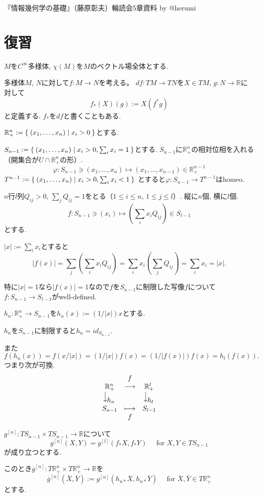 \documentclass{jsarticle}
\newcommand{\RR}{\mathbb{R}}
\theoremstyle{definition}
\numberwithin{theorem}{section}
\begin{document}
『情報幾何学の基礎』（藤原彰夫）輪読会5章資料 by @herumi

\section{復習}
$M$を$C^\infty$多様体, $\chi(M)$を$M$のベクトル場全体とする.

多様体$M$, $N$に対して$f:M \rightarrow N$を考える。
$df:TM \rightarrow TN$を$X \in TM$, $g:N \rightarrow \RR$に対して
\[
f_*(X)(g):=X(f^*g)
\]
と定義する. $f_*$を$df$と書くこともある.

$\RR^n_+:=\Set{(x_1, \dots, x_n)|x_i>0}$とする.

$S_{n-1}:=\Set{(x_1, \dots, x_n)|x_i>0, \sum_i x_i = 1}$とする.
$S_{n-1}$に$\RR^n_+$の相対位相を入れる（開集合が$U \cap \RR^n_+$の形）.
\[
\varphi:S_{n-1} \ni (x_1, \dots, x_n) \mapsto (x_1, \dots, x_{n-1}) \in \RR^{n-1}_+
\]
$T^{n-1}:=\Set{(x_1, \dots, x_n)|x_i>0, \sum_i x_i < 1}$
とすると$\varphi:S_{n-1} \rightarrow T^{n-1}$はhomeo.

$n$行$l$列$Q_{ij}>0$, $\sum_j Q_{ij}=1$をとる（$1 \le i \le n$, $1 \le j \le l$）. 縦に$n$個, 横に$l$個.
\[
f:S_{n-1} \ni (x_i) \mapsto (\sum_i x_i Q_{ij}) \in S_{l-1}
\]
とする.

$|x|:=\sum_i x_i$とすると
\[
|f(x)|=\sum_j (\sum_i x_i Q_{ij})=\sum_i x_i (\sum_j Q_{ij})=\sum_i x_i =|x|.
\]

特に$|x|=1$なら$|f(x)|=1$なので$f$を$S_{n-1}$に制限した写像$f$について$f:S_{n-1}\rightarrow S_{l-1}$がwell-defined.

$h_n:\RR^n_+ \rightarrow S_{n-1}$を$h_n(x):=(1/|x|)x$とする.

$h_n$を$S_{n-1}$に制限すると$h_n=id_{S_{n-1}}$.

また
\[
f(h_n(x))=f(x/|x|)=(1/|x|)f(x)=(1/|f(x)|)f(x)=h_l(f(x)).
\]
つまり次が可換.
\[
\begin{array}{ccc}
& f & \\
\RR^n_+ & \longrightarrow & \RR^l_+ \\
\rotatebox{90}{$\longleftarrow$}h_n &             & \rotatebox{90}{$\longleftarrow$}h_l \\
S_{n-1}             & \longmapsto & S_{l-1} \\
& f &
\end{array}
\]

$g^{[n]}:TS_{n-1} \times TS_{n-1} \rightarrow \RR$について
\[
g^{[n]}(X,Y)=g^{[l]}(f_* X, f_* Y) \quad \text{ for } X, Y \in TS_{n-1}
\]
が成り立つとする.

このとき$\overline{g}^{[n]} : T\RR^n_+ \times T\RR^n_+ \rightarrow \RR$を
\[
\overline{g}^{[n]}(\overline{X}, \overline{Y}):=g^{[n]}(h_{n*} \overline{X}, h_{n*} \overline{Y}) \quad \text{ for } \overline{X}, \overline{Y} \in T\RR^n_+
\]
とする.
\end{document}
